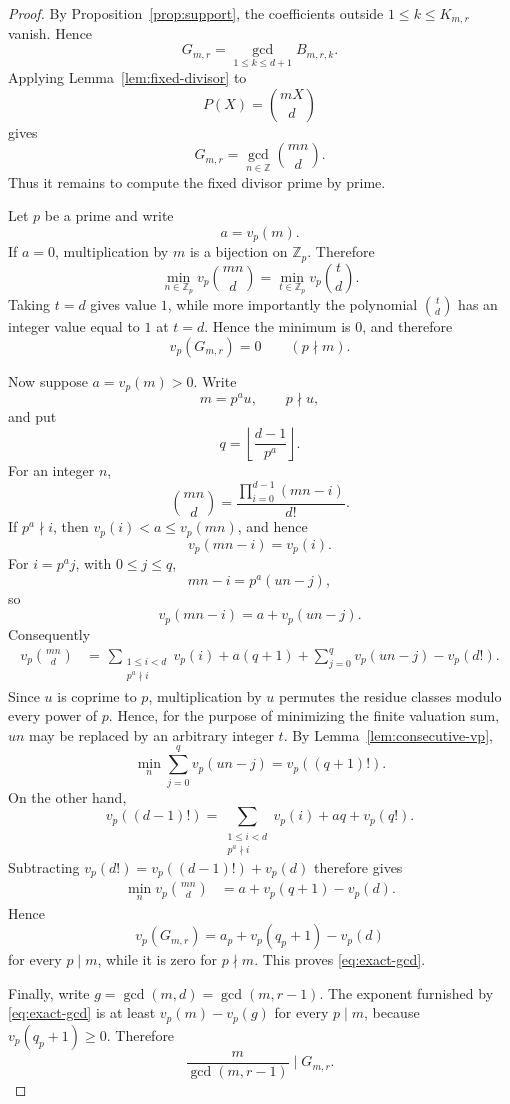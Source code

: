 \documentclass[10pt,a4paper]{amsart}
\newcommand{\Z}{\mathbb Z}
\begin{document}
\begin{proof}
By Proposition~\ref{prop:support}, the coefficients outside
$1\le k\le K_{m,r}$ vanish. Hence
\[
 G_{m,r}
 =
 \gcd_{1\le k\le d+1}B_{m,r,k}.
\]
Applying Lemma~\ref{lem:fixed-divisor} to
\[
 P(X)=\binom{mX}{d}
\]
gives
\begin{equation}
\label{eq:fixed-divisor}
 G_{m,r}
 =
 \gcd_{n\in\Z}\binom{mn}{d}.
\end{equation}
Thus it remains to compute the fixed divisor prime by prime.

Let $p$ be a prime and write
\[
 a=v_p(m).
\]
If $a=0$, multiplication by $m$ is a bijection on $\Z_p$. Therefore
\[
 \min_{n\in\Z_p}v_p\binom{mn}{d}
 =
 \min_{t\in\Z_p}v_p\binom{t}{d}.
\]
Taking $t=d$ gives value $1$, while more importantly the polynomial
$\binom{t}{d}$ has an integer value equal to $1$ at $t=d$. Hence the
minimum is $0$, and therefore
\[
 v_p(G_{m,r})=0
 \qquad(p\nmid m).
\]

Now suppose $a=v_p(m)>0$. Write
\[
 m=p^a u,\qquad p\nmid u,
\]
and put
\[
 q=\left\lfloor\frac{d-1}{p^a}\right\rfloor.
\]
For an integer $n$,
\[
 \binom{mn}{d}
 =
 \frac{\prod_{i=0}^{d-1}(mn-i)}{d!}.
\]
If $p^a\nmid i$, then $v_p(i)<a\le v_p(mn)$, and hence
\[
 v_p(mn-i)=v_p(i).
\]
For $i=p^aj$, with $0\le j\le q$,
\[
 mn-i=p^a(un-j),
\]
so
\[
 v_p(mn-i)=a+v_p(un-j).
\]
Consequently
\[
\begin{aligned}
 v_p\binom{mn}{d}
 &=
 \frac{}{}\sum_{\substack{1\le i<d\\p^a\nmid i}}v_p(i)
 +a(q+1)
 +\sum_{j=0}^{q}v_p(un-j)
 -v_p(d!).
\end{aligned}
\]
Since $u$ is coprime to $p$, multiplication by $u$ permutes the residue
classes modulo every power of $p$. Hence, for the purpose of minimizing
the finite valuation sum, $un$ may be replaced by an arbitrary integer
$t$. By Lemma~\ref{lem:consecutive-vp},
\[
 \min_n\sum_{j=0}^{q}v_p(un-j)
 =
 v_p((q+1)!).
\]
On the other hand,
\[
 v_p((d-1)!)
 =
 \sum_{\substack{1\le i<d\\p^a\nmid i}}v_p(i)
 +aq+v_p(q!).
\]
Subtracting $v_p(d!)=v_p((d-1)!)+v_p(d)$ therefore gives
\[
\begin{aligned}
 \min_n v_p\binom{mn}{d}
 &=
 a+v_p(q+1)-v_p(d).
\end{aligned}
\]
Hence
\[
 v_p(G_{m,r})
 =
 a_p+v_p(q_p+1)-v_p(d)
\]
for every $p\mid m$, while it is zero for $p\nmid m$. This proves
\eqref{eq:exact-gcd}.

Finally, write $g=\gcd(m,d)=\gcd(m,r-1)$. The exponent furnished by
\eqref{eq:exact-gcd} is at least $v_p(m)-v_p(g)$ for every $p\mid m$,
because $v_p(q_p+1)\ge0$. Therefore
\[
 \frac{m}{\gcd(m,r-1)}\mid G_{m,r}.
\]
\end{proof}
\end{document}
